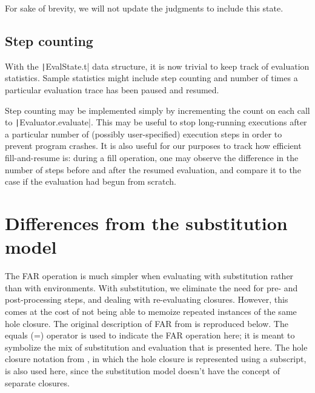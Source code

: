 For sake of brevity, we will not update the judgments to include this state.

\subsection{Step counting}
\label{sec:step-counting}

With the \texttt|EvalState.t| data structure, it is now trivial to keep track of evaluation statistics. Sample statistics might include step counting and number of times a particular evaluation trace has been paused and resumed.

Step counting may be implemented simply by incrementing the count on each call to \texttt|Evaluator.evaluate|. This may be useful to stop long-running executions after a particular number of (possibly user-specified) execution steps in order to prevent program crashes. It is also useful for our purposes to track how efficient fill-and-resume is: during a fill operation, one may observe the difference in the number of steps before and after the resumed evaluation, and compare it to the case if the evaluation had begun from scratch.

\section{Differences from the substitution model}
\label{sec:far-sub}

The FAR operation is much simpler when evaluating with substitution rather than with environments. With substitution, we eliminate the need for pre- and post-processing steps, and dealing with re-evaluating closures. However, this comes at the cost of not being able to memoize repeated instances of the same hole closure. The original description of FAR from \cite{conf/popl/HazelnutLive19} is reproduced below. The equals (=) operator is used to indicate the FAR operation here; it is meant to symbolize the mix of substitution and evaluation that is presented here. The hole closure notation from \cite{conf/popl/HazelnutLive19}, in which the hole closure is represented using a subscript, is also used here, since the substitution model doesn't have the concept of separate closures.


